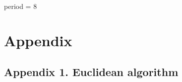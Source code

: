 \documentclass[
]{article}
\newenvironment{Shaded}{\begin{snugshade}}{\end{snugshade}}
\newcommand{\NormalTok}[1]{#1}
\begin{document}
\begin{Shaded}
\begin{Highlighting}[]
\NormalTok{period = 8}
\end{Highlighting}
\end{Shaded}

\pagebreak

\hypertarget{appendix}{%
\section{Appendix}\label{appendix}}

\hypertarget{appendix-1-euclidean-algorithm}{%
\subsection{Appendix 1. Euclidean
algorithm}\label{appendix-1-euclidean-algorithm}}
\end{document}
